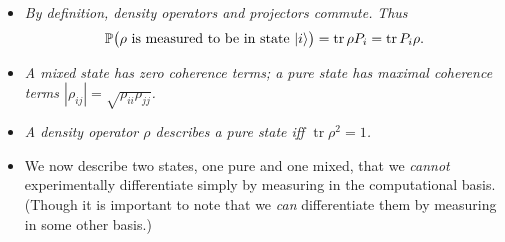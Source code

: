 \documentclass[10pt]{article}
\DeclarePairedDelimiter\ket{\lvert}{\rangle}
\DeclareMathOperator{\tr}{tr}
\begin{document}
            \begin{itemize}
                \item \emph{By definition, density operators and projectors commute.}
                    \emph{Thus}
                    \begin{equation*}
                        \mathbb{P}\big(\rho\text{ is measured to be in state }\ket{i}\big) = \tr\rho P_i = \tr P_i\rho.
                    \end{equation*}
                \item \emph{A mixed state has zero coherence terms; a pure state has maximal coherence terms $|\rho_{ij}|=\sqrt{\rho_{ii}\rho_{jj}}$.}

                \item \emph{A density operator $\rho$ describes a pure state iff $\tr\rho^2=1$.}

                \item We now describe two states, one pure and one mixed, that we \emph{cannot} experimentally differentiate simply by measuring in the computational basis.
                    (Though it is important to note that we \emph{can} differentiate them by measuring in some other basis.)


\end{itemize}
\end{document}

